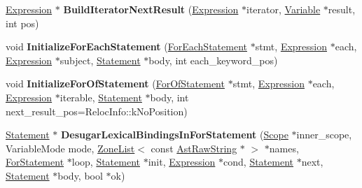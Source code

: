 \begin{DoxyCompactItemize}
\item 
\hyperlink{classv8_1_1internal_1_1_expression}{Expression} $\ast$ {\bfseries Build\+Iterator\+Next\+Result} (\hyperlink{classv8_1_1internal_1_1_expression}{Expression} $\ast$iterator, \hyperlink{classv8_1_1internal_1_1_variable}{Variable} $\ast$result, int pos)\hypertarget{classv8_1_1internal_1_1_parser_acd439190ba967cc8ed5e0607d5936330}{}\label{classv8_1_1internal_1_1_parser_acd439190ba967cc8ed5e0607d5936330}

\item 
void {\bfseries Initialize\+For\+Each\+Statement} (\hyperlink{classv8_1_1internal_1_1_for_each_statement}{For\+Each\+Statement} $\ast$stmt, \hyperlink{classv8_1_1internal_1_1_expression}{Expression} $\ast$each, \hyperlink{classv8_1_1internal_1_1_expression}{Expression} $\ast$subject, \hyperlink{classv8_1_1internal_1_1_statement}{Statement} $\ast$body, int each\+\_\+keyword\+\_\+pos)\hypertarget{classv8_1_1internal_1_1_parser_a1c3b1e1fb11c8d10f283b19ca63bd2a7}{}\label{classv8_1_1internal_1_1_parser_a1c3b1e1fb11c8d10f283b19ca63bd2a7}

\item 
void {\bfseries Initialize\+For\+Of\+Statement} (\hyperlink{classv8_1_1internal_1_1_for_of_statement}{For\+Of\+Statement} $\ast$stmt, \hyperlink{classv8_1_1internal_1_1_expression}{Expression} $\ast$each, \hyperlink{classv8_1_1internal_1_1_expression}{Expression} $\ast$iterable, \hyperlink{classv8_1_1internal_1_1_statement}{Statement} $\ast$body, int next\+\_\+result\+\_\+pos=Reloc\+Info\+::k\+No\+Position)\hypertarget{classv8_1_1internal_1_1_parser_a2e4cd1491fda2f94be4a24ec0a1157a2}{}\label{classv8_1_1internal_1_1_parser_a2e4cd1491fda2f94be4a24ec0a1157a2}

\item 
\hyperlink{classv8_1_1internal_1_1_statement}{Statement} $\ast$ {\bfseries Desugar\+Lexical\+Bindings\+In\+For\+Statement} (\hyperlink{classv8_1_1internal_1_1_scope}{Scope} $\ast$inner\+\_\+scope, Variable\+Mode mode, \hyperlink{classv8_1_1internal_1_1_zone_list}{Zone\+List}$<$ const \hyperlink{classv8_1_1internal_1_1_ast_raw_string}{Ast\+Raw\+String} $\ast$ $>$ $\ast$names, \hyperlink{classv8_1_1internal_1_1_for_statement}{For\+Statement} $\ast$loop, \hyperlink{classv8_1_1internal_1_1_statement}{Statement} $\ast$init, \hyperlink{classv8_1_1internal_1_1_expression}{Expression} $\ast$cond, \hyperlink{classv8_1_1internal_1_1_statement}{Statement} $\ast$next, \hyperlink{classv8_1_1internal_1_1_statement}{Statement} $\ast$body, bool $\ast$ok)\hypertarget{classv8_1_1internal_1_1_parser_a4984daef70cb3302fede4fa59c2114b8}{}\label{classv8_1_1internal_1_1_parser_a4984daef70cb3302fede4fa59c2114b8}


\end{DoxyCompactItemize}
